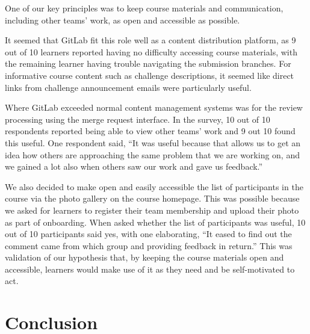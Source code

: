 \documentclass[12pt,twoside]{mitthesis}
\newcommand{\review}[1]{{\color{mygreen} #1}}
\begin{document}
\review{One of our key principles was to keep course materials and communication, including other teams' work, as open and accessible as possible. 

It seemed that GitLab fit this role well as a content distribution platform, as 9 out of 10 learners reported having no difficulty accessing course materials, with the remaining learner having trouble navigating the submission branches. For informative course content such as challenge descriptions, it seemed like direct links from challenge announcement emails were particularly useful.

Where GitLab exceeded normal content management systems was for the review processing using the merge request interface. In the survey, 10 out of 10 respondents reported being able to view other teams' work and 9 out 10 found this useful. One respondent said, ``It was useful because that allows us to get an idea how others are approaching the same problem that we are working on, and we gained a lot also when others saw our work and gave us feedback.'' 

We also decided to make open and easily accessible the list of participants in the course via the photo gallery on the course homepage. This was possible because we asked for learners to register their team membership and upload their photo as part of onboarding. When asked whether the list of participants was useful, 10 out of 10 participants said yes, with one elaborating, ``It eased to find out the comment came from which group and providing feedback in return.'' This was validation of our hypothesis that, by keeping the course materials open and accessible, learners would make use of it as they need and be self-motivated to act.}

\chapter{Conclusion}
\end{document}
